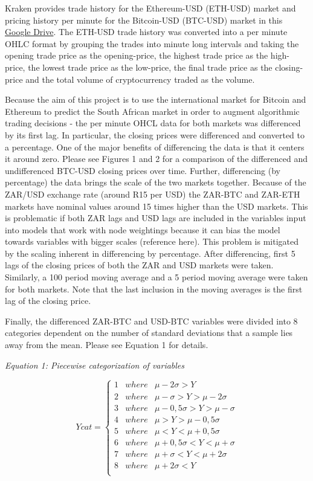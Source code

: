 \documentclass[
]{article}
\begin{document}
Kraken provides trade history for the Ethereum-USD (ETH-USD) market and
pricing history per minute for the Bitcoin-USD (BTC-USD) market in this
\href{https://drive.google.com/drive/folders/1jI3mZvrPbInNAEaIOoMbWvFfgRDZ44TT}{Google
Drive}. The ETH-USD trade history was converted into a per minute OHLC
format by grouping the trades into minute long intervals and taking the
opening trade price as the opening-price, the highest trade price as the
high-price, the lowest trade price as the low-price, the final trade
price as the closing-price and the total volume of cryptocurrency traded
as the volume.

Because the aim of this project is to use the international market for
Bitcoin and Ethereum to predict the South African market in order to
augment algorithmic trading decisions - the per minute OHCL data for
both markets was differenced by its first lag. In particular, the
closing prices were differenced and converted to a percentage. One of
the major benefits of differencing the data is that it centers it around
zero. Please see Figures 1 and 2 for a comparison of the differenced and
undifferenced BTC-USD closing prices over time. Further, differencing
(by percentage) the data brings the scale of the two markets together.
Because of the ZAR/USD exchange rate (around R15 per USD) the ZAR-BTC
and ZAR-ETH markets have nominal values around 15 times higher than the
USD markets. This is problematic if both ZAR lags and USD lags are
included in the variables input into models that work with node
weightings because it can bias the model towards variables with bigger
scales (reference here). This problem is mitigated by the scaling
inherent in differencing by percentage. After differencing, first 5 lags
of the closing prices of both the ZAR and USD markets were taken.
Similarly, a 100 period moving average and a 5 period moving average
were taken for both markets. Note that the last inclusion in the moving
averages is the first lag of the closing price.

Finally, the differenced ZAR-BTC and USD-BTC variables were divided into
8 categories dependent on the number of standard deviations that a
sample lies away from the mean. Please see Equation 1 for details.

\emph{Equation 1: Piecewise categorization of variables}

\[ Ycat=   \left\{
\begin{array}{ll}
      1 & where & \mu-2\sigma>Y \\
      2 & where & \mu-\sigma>Y>\mu-2\sigma \\
      3 & where & \mu-0,5\sigma>Y>\mu-\sigma \\
      4 & where & \mu>Y>\mu-0,5\sigma \\
      5 & where & \mu<Y<\mu+0,5\sigma \\
      6 & where & \mu+0,5\sigma<Y<\mu+\sigma \\
      7 & where & \mu+\sigma<Y<\mu+2\sigma \\
      8 & where & \mu+2\sigma<Y \\
\end{array} 
\right.  
\]
\end{document}
